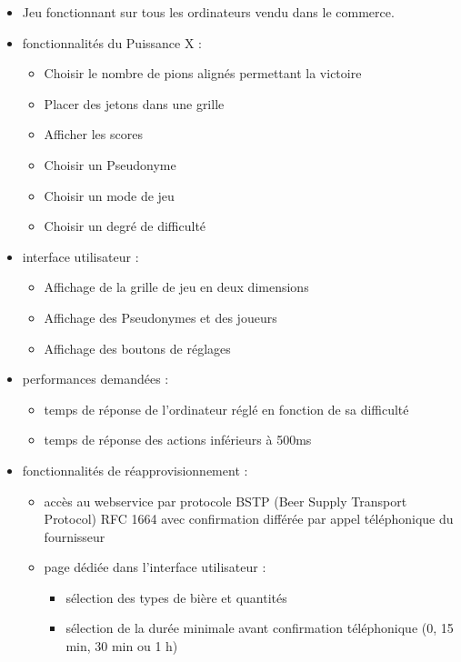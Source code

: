 \documentclass[a4paper,oneside]{article}
\begin{document}
\begin{itemize}
    \item Jeu fonctionnant sur tous les ordinateurs vendu dans le commerce.
    \item fonctionnalités du Puissance X :
        \begin{itemize}
        	\item Choisir le nombre de pions alignés permettant la victoire
            \item Placer des jetons dans une grille
            \item Afficher les scores
            \item Choisir un Pseudonyme 
            \item Choisir un mode de jeu
            \item Choisir un degré de difficulté
        \end{itemize}
    \item interface utilisateur :
        \begin{itemize}
            \item Affichage de la grille de jeu en deux dimensions
            \item Affichage des Pseudonymes et des joueurs
            \item Affichage des boutons de réglages
        \end{itemize}
    \item performances demandées :
        \begin{itemize}
            \item temps de réponse de l'ordinateur réglé en fonction de sa difficulté
            \item temps de réponse des actions inférieurs à 500ms
        \end{itemize}
    \item fonctionnalités de réapprovisionnement :
        \begin{itemize}
            \item accès au webservice par protocole BSTP (Beer Supply Transport Protocol) RFC 1664 avec confirmation différée par appel téléphonique du fournisseur
            \item page dédiée dans l'interface utilisateur : 
                \begin{itemize}
                    \item sélection des types de bière et quantités 
                    \item sélection de la durée minimale avant confirmation téléphonique (0, 15 min, 30 min ou 1 h)
                \end{itemize}
        \end{itemize}
\end{itemize}
\end{document}
